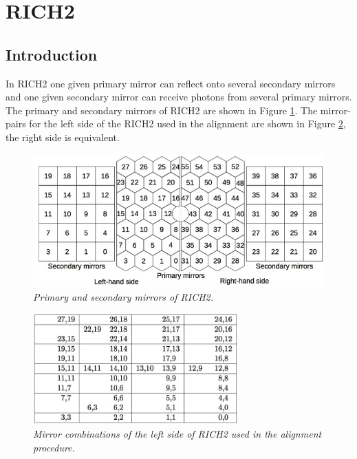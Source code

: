 \clearpage





\section{RICH2}
\subsection{Introduction}
In RICH2 one given primary mirror can reflect onto several secondary mirrors and one given secondary mirror can receive photons from several primary mirrors. The primary and secondary mirrors of RICH2 are shown in Figure \ref{fig:rich2mirr}. The mirror-pairs for the left side of the RICH2 used in the alignment are shown in Figure \ref{fig:rich2combis}, the right side is equivalent. 
\begin{figure}[!h]
	\vspace*{-0.3cm}
	\begin{center}
		\includegraphics[width=1.\textwidth]{rich2mirrors.png}
		\vspace*{-1.cm}
	\end{center}
	\caption{\textit{Primary and secondary mirrors of RICH2.}}
	\label{fig:rich2mirr}
\end{figure}

\begin{figure}[!h]
	\vspace*{-0.4cm}
	\begin{center}
		\includegraphics[width=0.7\textwidth]{rich2combis.png}
		\vspace*{-0.5cm}
	\end{center}
	\caption{\textit{Mirror combinations of the left side of RICH2 used in the alignment procedure.}}
	\label{fig:rich2combis}
\end{figure}

